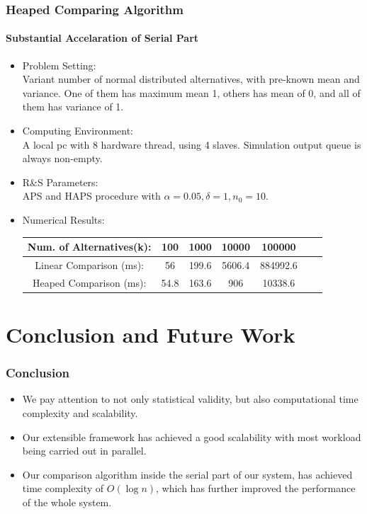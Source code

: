 \documentclass{beamer}
\begin{document}
\begin{frame}
\frametitle{Heaped Comparing Algorithm}
\framesubtitle{Substantial Accelaration of Serial Part}
\begin{itemize}
\item {Problem Setting: } \\ Variant number of normal distributed alternatives, with pre-known mean and variance. One of them has maximum mean 1, others has mean of 0, and all of them has variance of 1.
\item {Computing Environment: } \\ A local pc with 8 hardware thread, using 4 slaves. Simulation output queue is always non-empty.
\item {R\&S Parameters: } \\ APS and HAPS procedure with $\alpha=0.05, \delta=1, n_0 = 10$.
\item {Numerical Results: }
\begin{table}[ht]
\begin{center}
\scalebox{0.85}
{
\begin{tabular}{|c|c|c|c|c|c|c|}
\hline
Num. of Alternatives(k): & 100 & 1000 & 10000 & 100000 \\
\hline
Linear Comparison (ms): & 56 & 199.6 & 5606.4 & 884992.6 \\
\hline
Heaped Comparison (ms): & 54.8 & 163.6 & 906 & 10338.6 \\
\hline
\end{tabular}
}
\end{center}
\end{table}
\end{itemize}
\end{frame}

\section{Conclusion and Future Work}

\begin{frame}
\frametitle{Conclusion}
\begin{itemize}
\item We pay attention to not only statistical validity, but also computational time complexity and scalability.
\vspace{\baselineskip}
\item Our extensible framework has achieved a good scalability with most workload being carried out in parallel.
\vspace{\baselineskip}
\item Our comparison algorithm inside the serial part of our system, has achieved time complexity of $O(\log n)$, which has further improved the performance of the whole system.
\end{itemize}
\end{frame}
\end{document}

